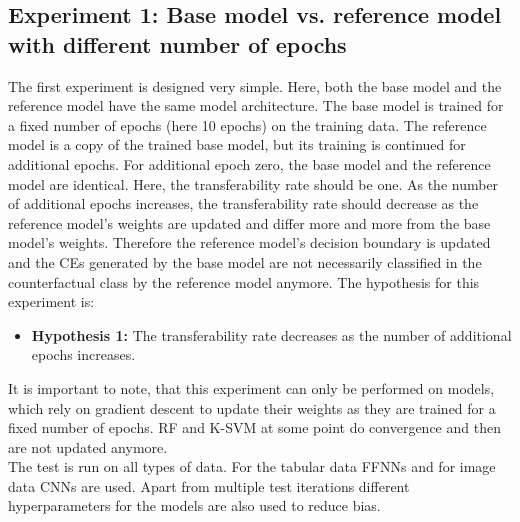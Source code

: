 \documentclass{article}
\begin{document}
\subsection{Experiment 1: Base model vs. reference model with different number of epochs}
The first experiment is designed very simple. Here, both the base model and the reference model have the same model architecture. The base model is trained for a fixed number of epochs (here 10 epochs) on the training data. The reference model is a copy of the trained base model, but its training is continued for additional epochs. For additional epoch zero, the base model and the reference model are identical. Here, the transferability rate should be one. As the number of additional epochs increases, the transferability rate should decrease as the reference model's weights are updated and differ more and more from the base model's weights. Therefore the reference model's decision boundary is updated and the CEs generated by the base model are not necessarily classified in the counterfactual class by the reference model anymore. 
The hypothesis for this experiment is:
\begin{itemize}
    \item \textbf{Hypothesis 1:} The transferability rate decreases as the number of additional epochs increases.
\end{itemize}
It is important to note, that this experiment can only be performed on models, which rely on gradient descent to update their weights as they are trained for a fixed number of epochs. RF and K-SVM at some point do convergence and then are not updated anymore. \\
The test is run on all types of data. For the tabular data FFNNs and for image data CNNs are used. Apart from multiple test iterations different hyperparameters for the models are also used to reduce bias.
\end{document}
